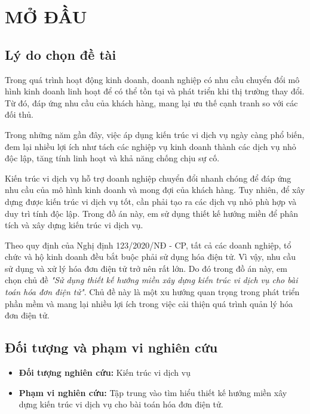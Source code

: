 \chapter*{\centering MỞ ĐẦU}


\section*{Lý do chọn đề tài}


Trong quá trình hoạt động kinh doanh, doanh nghiệp có nhu cầu chuyển đổi mô hình kinh doanh linh hoạt để có thể tồn tại và phát triển khi thị trường thay đổi. Từ đó, đáp ứng nhu cầu của khách hàng, mang lại ưu thế cạnh tranh so với các đối thủ.

Trong những năm gần đây, việc áp dụng kiến trúc vi dịch vụ ngày càng phổ biến, đem lại nhiều lợi ích như tách các nghiệp vụ kinh doanh thành các dịch vụ nhỏ độc lập, tăng tính linh hoạt và khả năng chống chịu sự cố.

Kiến trúc vi dịch vụ hỗ trợ doanh nghiệp chuyển đổi nhanh chóng để đáp ứng nhu cầu của mô hình kinh doanh và mong đợi của khách hàng. Tuy nhiên, để xây dựng được kiến trúc vi dịch vụ tốt, cần phải tạo ra các dịch vụ nhỏ phù hợp và duy trì tính độc lập. Trong đồ án này, em sử dụng thiết kế hướng miền để phân tích và xây dựng kiến trúc vi dịch vụ.

Theo quy định của Nghị định 123/2020/NĐ - CP, tất cả các doanh nghiệp, tổ chức và hộ kinh doanh đều bắt buộc phải sử dụng hóa điện tử. Vì vậy, nhu cầu sử dụng và xử lý hóa đơn điện tử trở nên rất lớn. Do đó trong đồ án này, em chọn chủ đề \emph{"Sử dụng thiết kế hướng miền xây dựng kiến trúc vi dịch vụ cho bài toán hóa đơn điện tử"}. Chủ đề này là một xu hướng quan trọng trong phát triển phần mềm và mang lại nhiều lợi ích trong việc cải thiện quá trình quản lý hóa đơn điện tử.


\section*{Đối tượng và phạm vi nghiên cứu}


\begin{itemize}

\item \textbf{Đối tượng nghiên cứu:} Kiến trúc vi dịch vụ

\item \textbf{Phạm vi nghiên cứu:} Tập trung vào tìm hiểu thiết kế hướng miền xây dựng kiến trúc vi dịch vụ cho bài toán hóa đơn điện tử.

\end{itemize}

